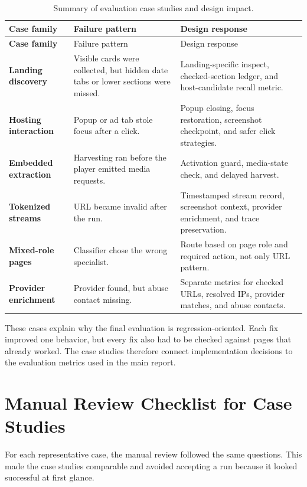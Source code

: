 \begin{longtable}{>{\raggedright\arraybackslash\bfseries}p{3.4cm}
                  >{\raggedright\arraybackslash}p{4.7cm}
                  >{\raggedright\arraybackslash}p{5.5cm}}
\caption{Summary of evaluation case studies and design impact.}
\label{tab:case-study-summary}\\
\toprule
\rowcolor{accent!8}
Case family & Failure pattern & Design response \\
\midrule
\endfirsthead
\toprule
\rowcolor{accent!8}
Case family & Failure pattern & Design response \\
\midrule
\endhead
\bottomrule
\endfoot
Landing discovery & Visible cards were collected, but hidden date tabs or lower
sections were missed. & Landing-specific inspect, checked-section ledger, and
host-candidate recall metric. \\
Hosting interaction & Popup or ad tab stole focus after a click. & Popup
closing, focus restoration, screenshot checkpoint, and safer click strategies. \\
Embedded extraction & Harvesting ran before the player emitted media requests.
& Activation guard, media-state check, and delayed harvest. \\
Tokenized streams & URL became invalid after the run. & Timestamped stream
record, screenshot context, provider enrichment, and trace preservation. \\
Mixed-role pages & Classifier chose the wrong specialist. & Route based on page
role and required action, not only URL pattern. \\
Provider enrichment & Provider found, but abuse contact missing. & Separate
metrics for checked URLs, resolved IPs, provider matches, and abuse contacts. \\
\end{longtable}

These cases explain why the final evaluation is regression-oriented. Each fix
improved one behavior, but every fix also had to be checked against pages that
already worked. The case studies therefore connect implementation decisions to
the evaluation metrics used in the main report.

\section{Manual Review Checklist for Case Studies}

For each representative case, the manual review followed the same questions.
This made the case studies comparable and avoided accepting a run because it
looked successful at first glance.

